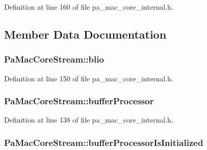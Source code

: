 Definition at line 160 of file pa\+\_\+mac\+\_\+core\+\_\+internal.\+h.



\subsection{Member Data Documentation}
\subsubsection[{\texorpdfstring{blio}{blio}}]{ Pa\+Mac\+Core\+Stream\+::blio}\hypertarget{struct_pa_mac_core_stream_aeb24427958d583443b64443a9e25cdec}{}\label{struct_pa_mac_core_stream_aeb24427958d583443b64443a9e25cdec}


Definition at line 150 of file pa\+\_\+mac\+\_\+core\+\_\+internal.\+h.

\subsubsection[{\texorpdfstring{buffer\+Processor}{bufferProcessor}}]{ Pa\+Mac\+Core\+Stream\+::buffer\+Processor}\hypertarget{struct_pa_mac_core_stream_aa4c9fb315b5a2a91164f62d40e1f35a7}{}\label{struct_pa_mac_core_stream_aa4c9fb315b5a2a91164f62d40e1f35a7}


Definition at line 138 of file pa\+\_\+mac\+\_\+core\+\_\+internal.\+h.

\subsubsection[{\texorpdfstring{buffer\+Processor\+Is\+Initialized}{bufferProcessorIsInitialized}}]{ Pa\+Mac\+Core\+Stream\+::buffer\+Processor\+Is\+Initialized}\hypertarget{struct_pa_mac_core_stream_ac6468bfef6a09086a8ba75bd1825b3f4}{}\label{struct_pa_mac_core_stream_ac6468bfef6a09086a8ba75bd1825b3f4}


